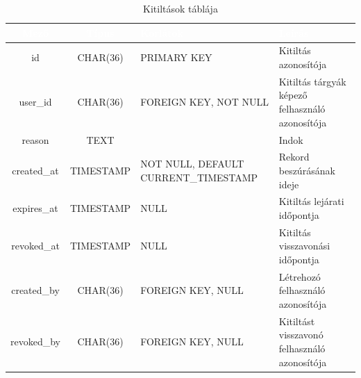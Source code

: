 \documentclass[12pt]{report}
\begin{document}
\begin{table}[h!]
    \centering
    \renewcommand{\arraystretch}{1.5}  %
    \begin{tabularx}{\textwidth}{|c|c|>{\raggedright\arraybackslash}X|>{\raggedright\arraybackslash}X|}  %
        \hline
        \rowcolor{gray!30} \textcolor{white}{\textbf{Mező}} & \textcolor{white}{\textbf{Típus}} & \textcolor{white}{\textbf{Korlátok}} & \textcolor{white}{\textbf{Leírás}} \\
        \hline
        id & CHAR(36) & PRIMARY KEY & Kitiltás azonosítója \\
        \hline
        user\_id & CHAR(36) & FOREIGN KEY, NOT NULL & Kitiltás tárgyák képező felhasználó azonosítója \\
        \hline
        reason & TEXT & & Indok \\
        \hline
        created\_at & TIMESTAMP & NOT NULL, DEFAULT CURRENT\_TIMESTAMP & Rekord beszúrásának ideje \\
        \hline
        expires\_at & TIMESTAMP & NULL & Kitiltás lejárati időpontja \\
        \hline
        revoked\_at & TIMESTAMP & NULL & Kitiltás visszavonási időpontja \\
        \hline
        created\_by & CHAR(36) & FOREIGN KEY, NULL & Létrehozó felhasználó azonosítója \\
        \hline
        revoked\_by & CHAR(36) & FOREIGN KEY, NULL & Kitiltást visszavonó felhasználó azonosítója \\
        \hline
    \end{tabularx}
    \caption{Kitiltások táblája}
    \label{tab:bans}
\end{table}
\end{document}
